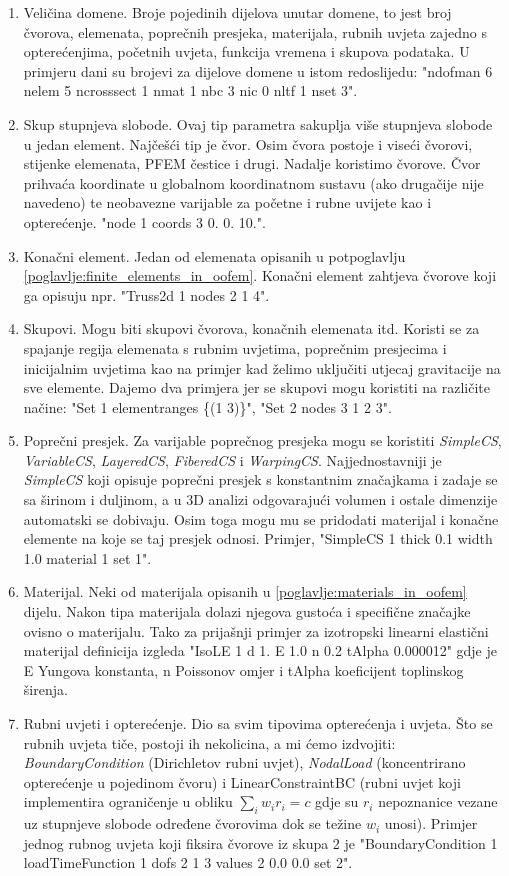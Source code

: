 \documentclass[a4paper,twoside,12pt]{memoir} %
\begin{document}
\begin{enumerate}
\begin{enumerate}
        \item Veličina domene. Broje pojedinih dijelova unutar domene, to jest broj čvorova, elemenata, poprečnih presjeka, materijala, rubnih uvjeta zajedno s opterećenjima, početnih uvjeta, funkcija vremena i skupova podataka. U primjeru dani su brojevi za dijelove domene u istom redoslijedu: "ndofman 6 nelem 5 ncrosssect 1 nmat 1 nbc 3 nic 0 nltf 1 nset 3".
        \item Skup stupnjeva slobode. Ovaj tip parametra sakuplja više stupnjeva slobode u jedan element. Najčešći tip je čvor. Osim čvora postoje i viseći čvorovi, stijenke elemenata, PFEM čestice i drugi. Nadalje koristimo čvorove. Čvor prihvaća koordinate u globalnom koordinatnom sustavu (ako drugačije nije navedeno) te neobavezne varijable za početne i rubne uvijete kao i opterećenje. "node 1 coords 3 0.  0. 10.".
        \item Konačni element. Jedan od elemenata opisanih u potpoglavlju \ref{poglavlje:finite_elements_in_oofem}. Konačni element zahtjeva čvorove koji ga opisuju npr. "Truss2d 1 nodes 2 1 4".
        \item Skupovi. Mogu biti skupovi čvorova, konačnih elemenata itd. Koristi se za spajanje regija elemenata s rubnim uvjetima, poprečnim presjecima i inicijalnim uvjetima kao na primjer kad želimo uključiti utjecaj gravitacije na sve elemente. Dajemo dva primjera jer se skupovi mogu koristiti na različite načine: "Set 1 elementranges \{(1 3)\}", "Set 2 nodes 3 1 2 3".  
        \item Poprečni presjek. Za varijable poprečnog presjeka mogu se koristiti \textit{SimpleCS}, \textit{VariableCS}, \textit{LayeredCS}, \textit{FiberedCS} i \textit{WarpingCS}. Najjednostavniji je \textit{SimpleCS} koji opisuje poprečni presjek s konstantnim značajkama i zadaje se sa širinom i duljinom, a u 3D analizi odgovarajući volumen i ostale dimenzije automatski se dobivaju. Osim toga mogu mu se pridodati materijal i konačne elemente na koje se taj presjek odnosi. Primjer, "SimpleCS 1 thick 0.1 width 1.0 material 1 set 1".
        \item Materijal. Neki od materijala opisanih u \ref{poglavlje:materials_in_oofem} dijelu. Nakon tipa materijala dolazi njegova gustoća i specifične značajke ovisno o materijalu. Tako za prijašnji primjer za izotropski linearni elastični materijal  definicija izgleda "IsoLE 1 d 1. E 1.0 n 0.2  tAlpha 0.000012" gdje je E Yungova konstanta, n Poissonov omjer i tAlpha koeficijent toplinskog širenja.
        \item Rubni uvjeti i opterećenje. Dio sa svim tipovima opterećenja i uvjeta. Što se rubnih uvjeta tiče, postoji ih nekolicina, a mi ćemo izdvojiti: \textit{BoundaryCondition} (Dirichletov rubni uvjet), \textit{NodalLoad} (koncentrirano opterećenje u pojedinom čvoru) i LinearConstraintBC (rubni uvjet koji implementira ograničenje u obliku $\sum_i w_i r_i = c$ gdje su $r_i$ nepoznanice vezane uz stupnjeve slobode određene čvorovima dok se težine $w_i$ unosi). Primjer jednog rubnog uvjeta koji fiksira čvorove iz skupa 2 je "BoundaryCondition 1 loadTimeFunction 1 dofs 2 1 3 values 2 0.0 0.0 set 2". 

\end{enumerate}
\end{enumerate}
\end{document}
